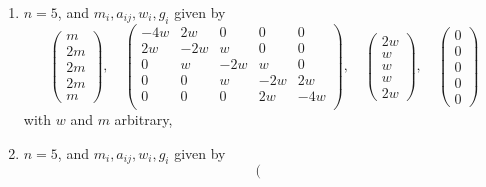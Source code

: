 \begin{lemma}
\begin{enumerate}
$$\begin{matrix}
0 & 2w & -4w & 2w & 0 \\
0 & 0 & 2w & -4w & 2w \\
0 & 0 & 0 & 2w & -2w \\
\end{matrix}
\right),
\quad
\left(
\begin{matrix}
w \\
2w \\
2w \\
2w \\
w
\end{matrix}
\right),
\quad
\left(
\begin{matrix}
0 \\
0 \\
0 \\
0 \\
0
\end{matrix}
\right)
$$
with $w$ and $m$ arbitrary,
\item
\label{models-item-down-equal-equal-up}
$n = 5$, and $m_i, a_{ij}, w_i, g_i$ given by
$$
\left(
\begin{matrix}
m \\
2m \\
2m \\
2m \\
m
\end{matrix}
\right),
\quad
\left(
\begin{matrix}
-4w & 2w & 0 & 0 & 0 \\
2w & -2w & w & 0 & 0 \\
0 & w & -2w & w & 0 \\
0 & 0 & w & -2w & 2w \\
0 & 0 & 0 & 2w & -4w \\
\end{matrix}
\right),
\quad
\left(
\begin{matrix}
2w \\
w \\
w \\
w \\
2w
\end{matrix}
\right),
\quad
\left(
\begin{matrix}
0 \\
0 \\
0 \\
0 \\
0
\end{matrix}
\right)
$$
with $w$ and $m$ arbitrary,
\item
\label{models-item-quadruple}
$n = 5$, and $m_i, a_{ij}, w_i, g_i$ given by
$$
\left(
\begin{matrix}

\end{matrix}$$
\end{enumerate}
\end{lemma}
